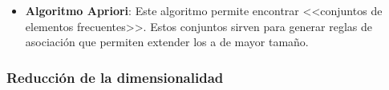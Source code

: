 \begin{itemize}
  \item \textbf{Algoritmo Apriori}: Este algoritmo permite encontrar <<conjuntos de elementos frecuentes>>. Estos conjuntos sirven para generar reglas de asociación que permiten extender los  a  de mayor tamaño.










\end{itemize}

\subsubsection{Reducción de la dimensionalidad}

